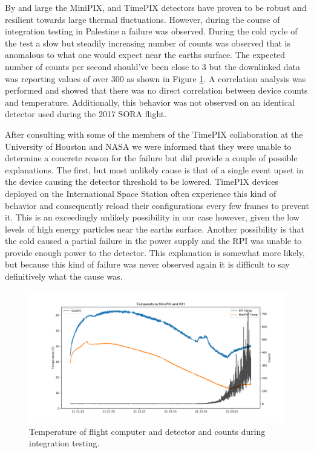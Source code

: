 By and large the MiniPIX, and TimePIX detectors have proven to be robust and resilient towards large thermal fluctuations. However, during the course of integration testing in Palestine a failure was observed. During the cold cycle of the test a slow but steadily increasing number of counts was observed that is anomalous to what one would expect near the earths surface. The expected number of counts per second should've been close to 3 but the downlinked data was reporting values of over 300 as shown in Figure \ref{fig:integrationtemps}.
A correlation analysis was performed and showed that there was no direct correlation between device counts and temperature. Additionally, this behavior was not observed on an identical detector used during the 2017 SORA flight. 

After consulting with some of the members of the TimePIX collaboration at the University of Houston and NASA we were informed that they were unable to determine a concrete reason for the failure but did provide a couple of possible explanations. The first, but most unlikely cause is that of a single event upset in the device causing the detector threshold to be lowered. TimePIX devices deployed on the International Space Station often experience this kind of behavior and consequently reload their configurations every few frames to prevent it. This is an exceedingly unlikely possibility in our case however, given the low levels of high energy particles near the earths surface. Another possibility is that the cold caused a partial failure in the power supply and the RPI was unable to provide enough power to the detector. This explanation is somewhat more likely, but because this kind of failure was never observed again it is difficult to say definitively what the cause was.

\begin{figure}[h!]
	\begin{center}
	\includegraphics[width=\textwidth]{figures/tempsandcountsvtime.png}
	\caption{Temperature of flight computer and detector and counts during integration testing.}
	\label{fig:integrationtemps}
	\end{center}
\end{figure}

